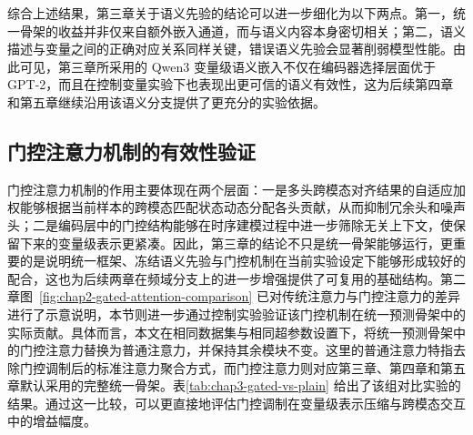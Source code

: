 综合上述结果，第三章关于语义先验的结论可以进一步细化为以下两点。第一，统一骨架的收益并非仅来自额外嵌入通道，而与语义内容本身密切相关；第二，语义描述与变量之间的正确对应关系同样关键，错误语义先验会显著削弱模型性能。由此可见，第三章所采用的 Qwen3 变量级语义嵌入不仅在编码器选择层面优于 GPT-2，而且在控制变量实验下也表现出更可信的语义有效性，这为后续第四章和第五章继续沿用该语义分支提供了更充分的实验依据。

\subsection{门控注意力机制的有效性验证}
门控注意力机制的作用主要体现在两个层面：一是多头跨模态对齐结果的自适应加权能够根据当前样本的跨模态匹配状态动态分配各头贡献，从而抑制冗余头和噪声头；二是编码层中的门控结构能够在时序建模过程中进一步筛除无关上下文，使保留下来的变量级表示更紧凑。因此，第三章的结论不只是统一骨架能够运行，更重要的是说明统一框架、冻结语义先验与门控机制在当前实验设定下能够形成较好的配合，这也为后续两章在频域分支上的进一步增强提供了可复用的基础结构。第二章图~\ref{fig:chap2-gated-attention-comparison} 已对传统注意力与门控注意力的差异进行了示意说明，本节则进一步通过控制实验验证该门控机制在统一预测骨架中的实际贡献。具体而言，本文在相同数据集与相同超参数设置下，将统一预测骨架中的门控注意力替换为普通注意力，并保持其余模块不变。这里的普通注意力特指去除门控调制后的标准注意力聚合方式，而门控注意力则对应第三章、第四章和第五章默认采用的完整统一骨架。表\ref{tab:chap3-gated-vs-plain} 给出了该组对比实验的结果。通过这一比较，可以更直接地评估门控调制在变量级表示压缩与跨模态交互中的增益幅度。


